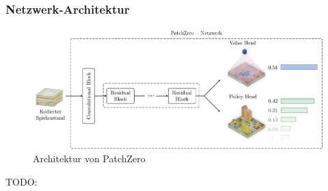 \subsubsection*{Netzwerk-Architektur}

\begin{figure}[!ht]
    \centering
    \vspace*{-1.75cm}
    \includegraphics[width=\textwidth]{res/pictures/patch-zero-architecture.pdf}
    \caption{Architektur von PatchZero}
    \label{fig:patch-zero-architecture}
\end{figure}

TODO:
